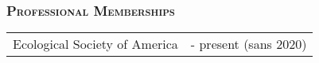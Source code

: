 \documentclass[10pt,english]{article}
\providecommand{\tabularnewline}{\\}
\begin{document}

\vspace{1ex}


\subsubsection*{\textsc{Professional Memberships}}
\vspace{-0.5ex}

\renewcommand{\arraystretch}{1.2}
\begin{tabularx}{\textwidth}{@{}>{\raggedright}p{4.5in} >{\raggedleft}X@{}}
Ecological Society of America & 2019 - present (sans 2020) \tabularnewline
\end{tabularx}

\end{document}
